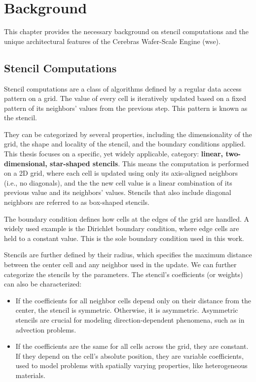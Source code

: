 \chapter{Background}
This chapter provides the necessary background on stencil computations and the unique architectural features of the Cerebras Wafer-Scale Engine (\ac{wse}).
\section{Stencil Computations}
Stencil computations are a class of algorithms defined by a regular data access pattern on a grid.
The value of every cell is iteratively updated based on a fixed pattern of its neighbors' values from the previous step.
This pattern is known as the stencil.

They can be categorized by several properties, including the dimensionality of the grid, the shape and locality of the stencil, and the boundary conditions applied.
This thesis focuses on a specific, yet widely applicable, category: \textbf{linear, two-dimensional, star-shaped stencils}.
This means the computation is performed on a 2D grid, where each cell is updated using only its axis-aligned neighbors (i.e., no diagonals), and the the new cell value is a linear combination of its previous value and its neighbors' values.
Stencils that also include diagonal neighbors are referred to as box-shaped stencils.

The boundary condition defines how cells at the edges of the grid are handled.
A widely used example is the Dirichlet boundary condition, where edge cells are held to a constant value.
This is the sole boundary condition used in this work.

Stencils are further defined by their radius, which specifies the maximum distance between the center cell and any neighbor used in the update.
We can further categorize the stencils by the parameters.
The stencil's coefficients (or weights) can also be characterized:

\begin{itemize}
    \item If the coefficients for all neighbor cells depend only on their distance from the center, the stencil is symmetric. Otherwise, it is asymmetric. Asymmetric stencils are crucial for modeling direction-dependent phenomena, such as in advection problems.
    \item If the coefficients are the same for all cells across the grid, they are constant. If they depend on the cell's absolute position, they are variable coefficients, used to model problems with spatially varying properties, like heterogeneous materials.
\end{itemize}

